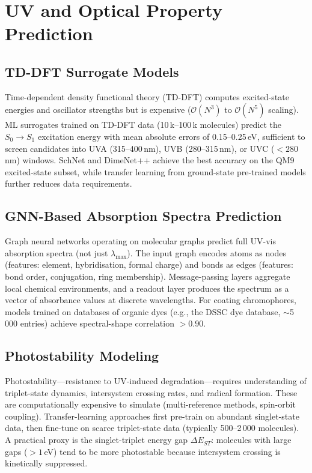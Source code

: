 \documentclass[11pt,a4paper]{article}
\begin{document}
\section{UV and Optical Property Prediction}
\label{sec:uvpred}

\subsection{TD-DFT Surrogate Models}

Time-dependent density functional theory (TD-DFT) computes excited-state energies and oscillator strengths but is expensive ($\mathcal{O}(N^3)$ to $\mathcal{O}(N^5)$ scaling).
ML surrogates trained on TD-DFT data (10\,k--100\,k molecules) predict the $S_0 \to S_1$ excitation energy with mean absolute errors of 0.15--0.25\,eV, sufficient to screen candidates into UVA (315--400\,nm), UVB (280--315\,nm), or UVC ($<280$\,nm) windows.
SchNet and DimeNet++ achieve the best accuracy on the QM9 excited-state subset, while transfer learning from ground-state pre-trained models further reduces data requirements.

\subsection{GNN-Based Absorption Spectra Prediction}

Graph neural networks operating on molecular graphs predict full UV-vis absorption spectra (not just $\lambda_\text{max}$).
The input graph encodes atoms as nodes (features: element, hybridisation, formal charge) and bonds as edges (features: bond order, conjugation, ring membership).
Message-passing layers aggregate local chemical environments, and a readout layer produces the spectrum as a vector of absorbance values at discrete wavelengths.
For coating chromophores, models trained on databases of organic dyes (e.g., the DSSC dye database, $\sim$5\,000 entries) achieve spectral-shape correlation $> 0.90$.

\subsection{Photostability Modeling}

Photostability---resistance to UV-induced degradation---requires understanding of triplet-state dynamics, intersystem crossing rates, and radical formation.
These are computationally expensive to simulate (multi-reference methods, spin-orbit coupling).
Transfer-learning approaches first pre-train on abundant singlet-state data, then fine-tune on scarce triplet-state data (typically 500--2\,000 molecules).
A practical proxy is the singlet-triplet energy gap $\Delta E_{ST}$: molecules with large gaps ($> 1$\,eV) tend to be more photostable because intersystem crossing is kinetically suppressed.
\end{document}
